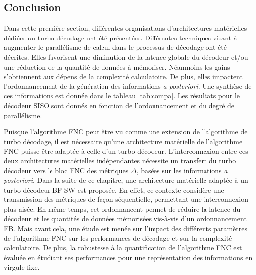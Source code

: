 \subsection{Conclusion}
Dans cette première section, différentes organisations d'architectures matérielles dédiées au turbo décodage ont été présentées.
Différentes techniques visant à augmenter le parallélisme de calcul dans le processus de décodage ont été décrites. 
Elles favorisent une diminution de la 
latence globale du décodeur et/ou une réduction de la quantité de données à mémoriser. Néanmoins les gains s’obtiennent
aux dépens de la complexité calculatoire. De plus, elles impactent l'ordonnancement de la génération des informations 
\textit{a posteriori}. Une synthèse de ces informations est donnée dans le tableau \ref{tab:compa}. Les résultats pour le décodeur SISO sont donnés en fonction de l'ordonnancement et du degré de
parallélisme.

Puisque l'algorithme FNC peut être vu comme une extension de l'algorithme de turbo décodage, il est nécessaire qu'une architecture 
matérielle de l'algorithme FNC puisse être adaptée à celle d'un turbo décodeur. L'interconnexion entre ces deux architectures 
matérielles indépendantes nécessite un transfert du turbo décodeur vers le bloc FNC des métriques $\Delta$, basées sur les 
informations \textit{a posteriori}. Dans la suite de ce chapitre, une architecture matérielle adaptée à un turbo décodeur BF-SW 
 est proposée. En effet, ce contexte considère une transmission des métriques de façon séquentielle, permettant une 
 interconnexion plus aisée. En même temps, cet ordonnancent permet de réduire la latence du décodeur et les quantités de données mémorisées vis-à-vis d'un ordonnancement FB.
Mais avant cela, une étude est menée sur l'impact des différents paramètres de l'algorithme FNC sur les performances de 
décodage et sur la complexité calculatoire. De plus, la robustesse à la quantification de l'algorithme FNC est évaluée
en étudiant ses performances pour une représentation des informations en virgule fixe.

